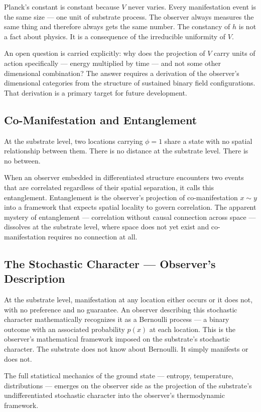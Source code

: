 \documentclass[12pt, letterpaper]{article}
\begin{document}
Planck's constant is constant because \(V\) never varies. Every manifestation
event is the same size --- one unit of substrate process. The observer always
measures the same thing and therefore always gets the same number. The constancy
of \(h\) is not a fact about physics. It is a consequence of the irreducible
uniformity of \(V\).

An open question is carried explicitly: why does the projection of \(V\) carry
units of action specifically --- energy multiplied by time --- and not some other
dimensional combination? The answer requires a derivation of the observer's
dimensional categories from the structure of sustained binary field
configurations. That derivation is a primary target for future development.
\subsection{Co-Manifestation and Entanglement}
\label{sec:org4072ae1}

At the substrate level, two locations carrying \(\phi = 1\) share a state with
no spatial relationship between them. There is no distance at the substrate
level. There is no between.

When an observer embedded in differentiated structure encounters two events that
are correlated regardless of their spatial separation, it calls this
entanglement. Entanglement is the observer's projection of co-manifestation
\(x \sim y\) into a framework that expects spatial locality to govern
correlation. The apparent mystery of entanglement --- correlation without causal
connection across space --- dissolves at the substrate level, where space does
not yet exist and co-manifestation requires no connection at all.
\subsection{The Stochastic Character --- Observer's Description}
\label{sec:org8541f75}

At the substrate level, manifestation at any location either occurs or it does
not, with no preference and no guarantee. An observer describing this stochastic
character mathematically recognizes it as a Bernoulli process --- a binary
outcome with an associated probability \(p(x)\) at each location. This is the
observer's mathematical framework imposed on the substrate's stochastic
character. The substrate does not know about Bernoulli. It simply manifests or
does not.

The full statistical mechanics of the ground state --- entropy, temperature,
distributions --- emerges on the observer side as the projection of the
substrate's undifferentiated stochastic character into the observer's
thermodynamic framework.
\end{document}

